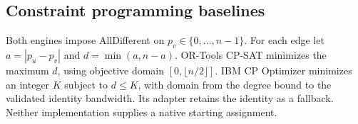 \subsection{Constraint programming baselines}
Both engines impose AllDifferent on $p_v\in\{0,\ldots,n-1\}$.
For each edge let $a=|p_u-p_v|$ and $d=\min(a,n-a)$.
OR-Tools CP-SAT minimizes the maximum $d$, using objective domain
$[0,\lfloor n/2\rfloor]$. IBM CP Optimizer minimizes an integer $K$
subject to $d\le K$, with domain from the degree bound to the validated
identity bandwidth. Its adapter retains the identity as a fallback.
Neither implementation supplies a native starting assignment.
